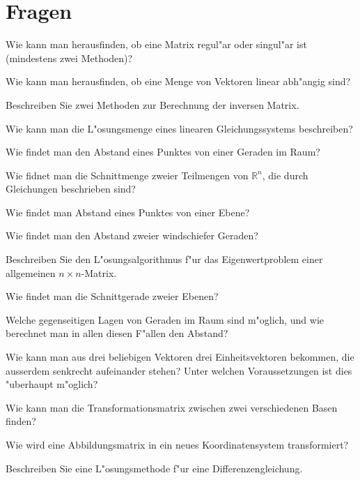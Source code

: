 \documentclass[a4paper,12pt,twocolumn]{article}
\begin{document}
\section{Fragen}
\begin{compactenum}
\item Wie kann man herausfinden, ob eine Matrix regul"ar oder singul"ar ist (mindestens zwei Methoden)?
\item Wie kann man herausfinden, ob eine Menge von Vektoren linear
abh"angig sind?
\item Beschreiben Sie zwei Methoden zur Berechnung der inversen Matrix.
\item Wie kann man die L"osungsmenge eines linearen Gleichungssystems
beschreiben?
\item Wie findet man den Abstand eines Punktes von einer Geraden im Raum?
\item Wie fidnet man die Schnittmenge zweier Teilmengen von $\mathbb R^n$, die
durch Gleichungen beschrieben sind?
\item Wie findet man Abstand eines Punktes von einer Ebene?
\item Wie findet man den Abstand zweier windschiefer Geraden?
\item Beschreiben Sie den L"osungsalgorithmus f"ur das Eigenwertproblem
einer allgemeinen $n\times n$-Matrix.
\item Wie findet man die Schnittgerade zweier Ebenen?
\item Welche gegenseitigen Lagen von Geraden im Raum sind m"oglich, und
wie berechnet man in allen diesen F"allen den Abstand?
\item Wie kann man aus drei beliebigen Vektoren drei Einheitsvektoren
bekommen, die ausserdem senkrecht aufeinander stehen?
Unter welchen Voraussetzungen ist dies "uberhaupt m"oglich?
\item Wie kann man die Transformationsmatrix zwischen zwei verschiedenen
Basen finden?
\item Wie wird eine Abbildungsmatrix in ein neues Koordinatensystem
transformiert?
\item Beschreiben Sie eine L"osungsmethode f"ur eine Differenzengleichung.
\end{compactenum}
\end{document}
